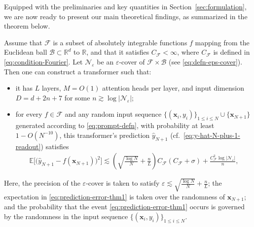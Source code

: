 \documentclass[english]{article}
\begin{document}
Equipped with the preliminaries and key quantities in Section~\ref{sec:formulation}, we are now ready to present our main theoretical findings, as summarized in the theorem below.
%
\begin{theorem}\label{thm:main}
Assume that $\mathcal{F}$ is a subset of absolutely integrable functions $f$ mapping from the Euclidean ball $\mathcal{B}\subset\mathbb{R}^d$ to $\mathbb{R}$, and that it satisfies $C_{\mathcal{F}}<\infty$, where  $C_{\mathcal{F}}$ is defined in \eqref{eq:condition-Fourier}.
Let $\mathcal{N}_\varepsilon$ be an $\varepsilon$-cover of $\mathcal{F}\times \mathcal{B}$ (see \eqref{eq:defn-eps-cover}).  
Then one can construct a transformer 
such that: 
%
\begin{itemize}
    \item[i)]  it has $L$ layers, $M=O(1)$ attention heads per layer, and input dimension $D=d+2n+7$ for some $n\gtrsim \log|\mathcal{N}_\varepsilon|$; 

    \item[ii)] for every $f\in \mathcal{F}$ and any random input sequence $\{({\bm x}_i,y_i)\}_{1\le i\le N} \cup \{\bm{x}_{N+1}\}$ generated according to \eqref{eq:prompt-defn}, with probability at least $1-O(N^{-10})$, this transformer's prediction $\widehat{y}_{N+1}$ (cf.~\eqref{eq:y-hat-N-plus-1-readout})  satisfies
\begin{align}
\mathbb{E}\big[\big(\widehat{y}_{N+1} - f( \bm{x}_{N+1}) \big)^2 \big]
\lesssim 
\left(\sqrt{\frac{\log N}{N}} + \frac{n}{L}\right)C_{\mathcal{F}}(C_{\mathcal{F}} + \sigma) + \frac{C_{\mathcal{F}}^2\log|\mathcal{N}_\varepsilon|}{n},
\label{eq:prediction-error-thm1}
\end{align}
%


\end{itemize}
Here, the precision of the $\varepsilon$-cover is taken to satisfy  $\varepsilon\lesssim \sqrt{\frac{\log N}{N}} + \frac{n}{L}$; the expectation in \eqref{eq:prediction-error-thm1} is taken over the randomness of ${\bm x}_{N+1}$; and the probability that the event \eqref{eq:prediction-error-thm1} occurs is governed by the randomness in the input sequence $\{({\bm x}_i, y_i)\}_{1\le i\le N}$. 

\end{theorem}
\end{document}
